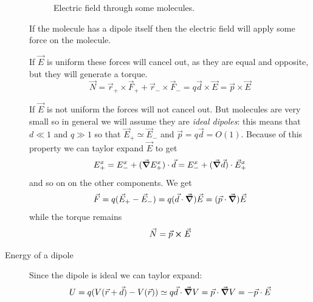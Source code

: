 \documentclass[12pt]{extarticle}
\begin{document}
\begin{description}
          \begin{figure}[H]
              \centering
              \qquad
              \subfloat[Water]{}
              \caption{Electric field through some molecules.}
          \end{figure}

          If the molecule has a dipole itself then the electric field will apply some force on the molecule.

          If $\vec E$ is uniform these forces will  cancel out, as they are equal and opposite, but they will generate a torque.
          \begin{equation}
              \vec N = \vec r_+ \times \vec F_+ + \vec r_- \times \vec F_- = q\vec d \times \vec E = \vec p \times \vec E
          \end{equation}

          If $\vec E$ is not uniform the forces will not cancel out.
          But molecules are very small so in general we will assume they are \emph{ideal dipoles}: this means that $d \ll 1$ and $q \gg 1$ so that $\vec E_+ \simeq \vec E_-$ and $\vec p = q\vec d = O(1)$.
          Because of this property we can taylor expand $\vec E$ to get
          \begin{equation}
              E^x_+ = E^x_- + (\grad E^x_+) \cdot \vec d = E^x_- + (\grad \vec d) \cdot \vec E^x_+
          \end{equation}
          and so on on the other components.
          We get
          \begin{equation}
              \vec F = q (\vec E_+ - \vec E_-) = q (\vec d \cdot \grad) \vec E = (\vec p \cdot \grad) \vec E
          \end{equation}
          while the torque remains
          \begin{equation}
              \vec N = \vec p \cross \vec E
          \end{equation}

    \item[Energy of a dipole]
          Since the dipole is ideal we can taylor expand:
          \begin{equation}
              U = q(V(\vec r + \vec d) - V(\vec r)) \simeq q\vec d \cdot \grad V = \vec p \cdot \grad V = - \vec p \cdot \vec E
          \end{equation}
\end{description}
\end{document}
